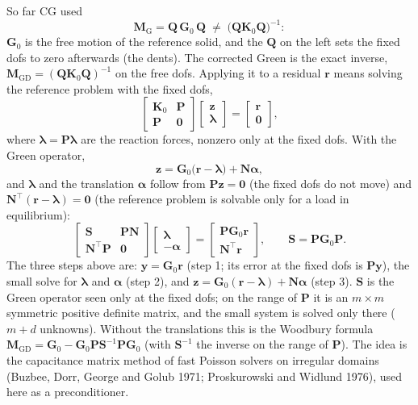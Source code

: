 \documentclass[11pt,a4paper]{article}
\begin{document}
So far CG used
\[
  \mathbf{M}_{\mathrm{G}} = \mathbf{Q}\,\mathbf{G}_0\,\mathbf{Q} \;\neq\; \bigl(\mathbf{Q}\mathbf{K}_0\mathbf{Q}\bigr)^{-1}:
\]
$\mathbf{G}_0$ is the free motion of the reference solid, and the $\mathbf{Q}$ on the left sets the fixed dofs to zero
afterwards (the dents). The corrected Green is the exact inverse, $\mathbf{M}_{\mathrm{GD}} =
(\mathbf{Q}\mathbf{K}_0\mathbf{Q})^{-1}$ on the free dofs. Applying it to a residual $\mathbf{r}$ means solving the
reference problem with the fixed dofs,
\[
  \begin{bmatrix} \mathbf{K}_0 & \mathbf{P} \\ \mathbf{P} & \mathbf{0} \end{bmatrix}
  \begin{bmatrix} \mathbf{z} \\ \boldsymbol{\lambda} \end{bmatrix}
  =
  \begin{bmatrix} \mathbf{r} \\ \mathbf{0} \end{bmatrix},
\]
where $\boldsymbol{\lambda} = \mathbf{P}\boldsymbol{\lambda}$ are the reaction forces, nonzero only at the fixed dofs.
With the Green operator,
\[
  \mathbf{z} = \mathbf{G}_0\bigl(\mathbf{r} - \boldsymbol{\lambda}\bigr) + \mathbf{N}\boldsymbol{\alpha},
\]
and $\boldsymbol{\lambda}$ and the translation $\boldsymbol{\alpha}$ follow from $\mathbf{P}\mathbf{z} = \mathbf{0}$
(the fixed dofs do not move) and $\mathbf{N}^{\top}(\mathbf{r} - \boldsymbol{\lambda}) = \mathbf{0}$ (the
reference problem is solvable only for a load in equilibrium):
\[
  \begin{bmatrix} \mathbf{S} & \mathbf{P}\mathbf{N} \\ \mathbf{N}^{\top}\mathbf{P} & \mathbf{0} \end{bmatrix}
  \begin{bmatrix} \boldsymbol{\lambda} \\ -\boldsymbol{\alpha} \end{bmatrix}
  =
  \begin{bmatrix} \mathbf{P}\mathbf{G}_0\mathbf{r} \\ \mathbf{N}^{\top}\mathbf{r} \end{bmatrix},
  \qquad
  \mathbf{S} = \mathbf{P}\mathbf{G}_0\mathbf{P}.
\]
The three steps above are: $\mathbf{y} = \mathbf{G}_0\mathbf{r}$ (step 1; its error at the fixed dofs is
$\mathbf{P}\mathbf{y}$), the small solve for $\boldsymbol{\lambda}$ and $\boldsymbol{\alpha}$ (step 2), and
$\mathbf{z} = \mathbf{G}_0(\mathbf{r} - \boldsymbol{\lambda}) + \mathbf{N}\boldsymbol{\alpha}$ (step 3).
$\mathbf{S}$ is the Green operator seen only at the fixed dofs; on the range of $\mathbf{P}$ it is an $m\times m$
symmetric positive definite matrix, and the small system is solved only there ($m + d$ unknowns). Without
the translations this is the Woodbury formula $\mathbf{M}_{\mathrm{GD}} = \mathbf{G}_0 -
\mathbf{G}_0\mathbf{P}\mathbf{S}^{-1}\mathbf{P}\mathbf{G}_0$ (with $\mathbf{S}^{-1}$ the inverse on the range of
$\mathbf{P}$). The idea is the capacitance matrix method of fast
Poisson solvers on irregular domains (Buzbee, Dorr, George and Golub 1971; Proskurowski and Widlund 1976), used here as a
preconditioner.
\end{document}
